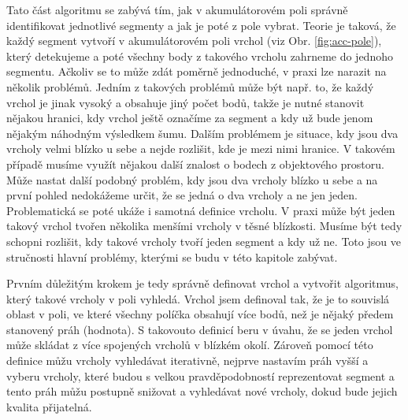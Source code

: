 \documentclass[11pt,twoside,a4paper]{book}
\begin{document}
Tato část algoritmu se zabývá tím, jak v akumulátorovém poli správně identifikovat jednotlivé segmenty a jak je poté z pole vybrat. Teorie je taková, že každý segment vytvoří v akumulátorovém poli vrchol (viz Obr. \ref{fig:acc-pole}), který detekujeme a poté všechny body z takového vrcholu zahrneme do jednoho segmentu. Ačkoliv se to může zdát poměrně jednoduché, v praxi lze narazit na několik problémů. Jedním z takových problémů může být např. to, že každý vrchol je jinak vysoký a obsahuje jiný počet bodů, takže je nutné stanovit nějakou hranici, kdy vrchol ještě označíme za segment a kdy už bude jenom nějakým náhodným výsledkem šumu. Dalším problémem je situace, kdy jsou dva vrcholy velmi blízko u sebe a nejde rozlišit, kde je mezi nimi hranice. V takovém případě musíme využít nějakou další znalost o bodech z objektového prostoru. Může nastat další podobný problém, kdy jsou dva vrcholy blízko u sebe a na první pohled nedokážeme určit, že se jedná o dva vrcholy a ne jen jeden. Problematická se poté ukáže i samotná definice vrcholu. V praxi může být jeden takový vrchol tvořen několika menšími vrcholy v těsné blízkosti. Musíme být tedy schopni rozlišit, kdy takové vrcholy tvoří jeden segment a kdy už ne. Toto jsou ve stručnosti hlavní problémy, kterými se budu v této kapitole zabývat.

Prvním důležitým krokem je tedy správně definovat vrchol a vytvořit algoritmus, který takové vrcholy v poli vyhledá. Vrchol jsem definoval tak, že je to souvislá oblast v poli, ve které všechny políčka obsahují více bodů, než je nějaký předem stanovený práh (hodnota). S takovouto definicí beru v úvahu, že se jeden vrchol může skládat z více spojených vrcholů v blízkém okolí. Zároveň pomocí této definice můžu vrcholy vyhledávat iterativně, nejprve nastavím práh vyšší a vyberu vrcholy, které budou s velkou pravděpodobností reprezentovat segment a tento práh můžu postupně snižovat a vyhledávat nové vrcholy, dokud bude jejich kvalita přijatelná.
\end{document}
